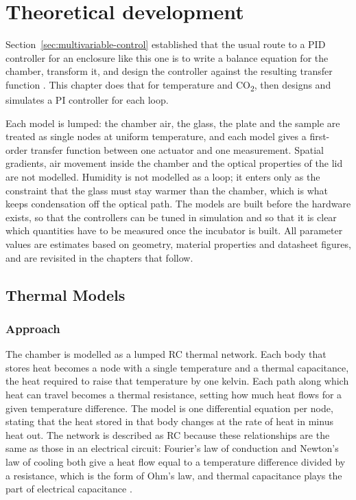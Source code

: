 \chapter{Theoretical development}
\label{ch:theory}

Section~\ref{sec:multivariable-control} established that the usual route to a PID controller for an enclosure like this one is to write a balance equation for the chamber, transform it, and design the controller against the resulting transfer function \citep{matamoros_temperature_2020}. This chapter does that for temperature and CO\textsubscript{2}, then designs and simulates a PI controller for each loop.

Each model is lumped: the chamber air, the glass, the plate and the sample are treated as single nodes at uniform temperature, and each model gives a first-order transfer function between one actuator and one measurement. Spatial gradients, air movement inside the chamber and the optical properties of the lid are not modelled. Humidity is not modelled as a loop; it enters only as the constraint that the glass must stay warmer than the chamber, which is what keeps condensation off the optical path. The models are built before the hardware exists, so that the controllers can be tuned in simulation and so that it is clear which quantities have to be measured once the incubator is built. All parameter values are estimates based on geometry, material properties and datasheet figures, and are revisited in the chapters that follow.

\section{Thermal Models}
\label{sec:temperature-model}

\subsection{Approach}
\label{subsec:modelling-approach}

The chamber is modelled as a lumped RC thermal network. Each body that stores heat becomes a node with a single temperature and a thermal capacitance, the heat required to raise that temperature by one kelvin. Each path along which heat can travel becomes a thermal resistance, setting how much heat flows for a given temperature difference. The model is one differential equation per node, stating that the heat stored in that body changes at the rate of heat in minus heat out. The network is described as RC because these relationships are the same as those in an electrical circuit: Fourier's law of conduction and Newton's law of cooling both give a heat flow equal to a temperature difference divided by a resistance, which is the form of Ohm's law, and thermal capacitance plays the part of electrical capacitance \citep{incropera_fundamentals_2007}.

